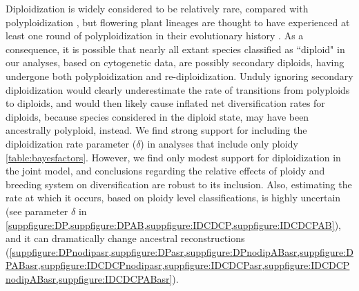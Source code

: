 
Diploidization is widely considered to be relatively rare, compared with polyploidization \citep{husband_2013}, but flowering plant lineages are thought to have experienced at least one round of polyploidization in their evolutionary history \citep{soltis_2015}.
As a consequence, it is possible that nearly all extant species classified as ``diploid" in our analyses, based on cytogenetic data, are possibly secondary diploids, having undergone both polyploidization and re-diploidization.
Unduly ignoring secondary diploidization would clearly underestimate the rate of transitions from polyploids to diploids, and would then likely cause inflated net diversification rates for diploids, because species considered in the diploid state, may have been ancestrally polyploid, instead. 
We find strong support for including the diploidization rate parameter ($\delta$) in analyses that include only ploidy \cref{table:bayesfactors}. %
However, we find only modest support for diploidization in the joint model, and conclusions regarding the relative effects of ploidy and breeding system on diversification are robust to its inclusion.
Also, estimating the rate at which it occurs, based on ploidy level classifications, is highly uncertain (see parameter $\delta$ in \cref{suppfigure:DP,suppfigure:DPAB,suppfigure:IDCDCP,suppfigure:IDCDCPAB}), and it can dramatically change ancestral reconstructions (\cref{suppfigure:DPnodipasr,suppfigure:DPasr,suppfigure:DPnodipABasr,suppfigure:DPABasr,suppfigure:IDCDCPnodipasr,suppfigure:IDCDCPasr,suppfigure:IDCDCPnodipABasr,suppfigure:IDCDCPABasr}).

